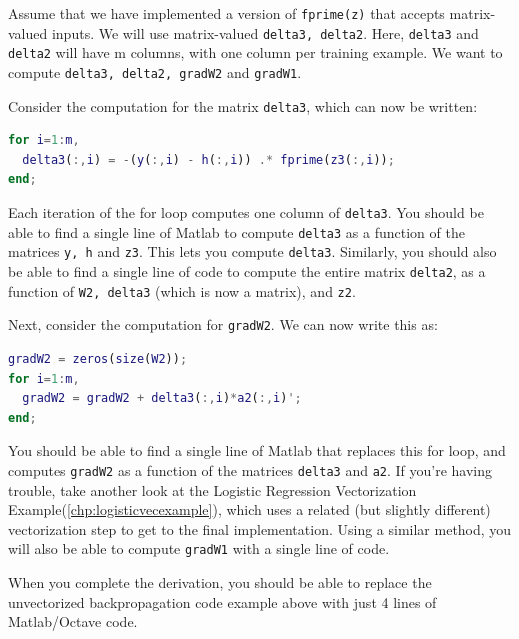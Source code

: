 Assume that we have implemented a version of \texttt{fprime(z)} that accepts matrix-valued inputs. We will use matrix-valued \texttt{delta3, delta2}. Here, \texttt{delta3} and \texttt{delta2} will have m columns, with one column per training example. We want to compute \texttt{delta3, delta2, gradW2} and \texttt{gradW1}.

Consider the computation for the matrix \texttt{delta3}, which can now be written:
\begin{lstlisting}[language=matlab]
for i=1:m, 
  delta3(:,i) = -(y(:,i) - h(:,i)) .* fprime(z3(:,i)); 
end;
\end{lstlisting}

Each iteration of the for loop computes one column of \texttt{delta3}. You should be able to find a single line of Matlab to compute \texttt{delta3} as a function of the matrices \texttt{y, h} and \texttt{z3}. This lets you compute \texttt{delta3}. Similarly, you should also be able to find a single line of code to compute the entire matrix \texttt{delta2}, as a function of \texttt{W2, delta3} (which is now a matrix), and \texttt{z2}.

Next, consider the computation for \texttt{gradW2}. We can now write this as:
\begin{lstlisting}[language=matlab]
gradW2 = zeros(size(W2));
for i=1:m, 
  gradW2 = gradW2 + delta3(:,i)*a2(:,i)';
end;
\end{lstlisting}

You should be able to find a single line of Matlab that replaces this for loop, and computes \texttt{gradW2} as a function of the matrices \texttt{delta3} and \texttt{a2}. If you're having trouble, take another look at the Logistic Regression Vectorization Example(\ref{chp:logisticvecexample}), which uses a related (but slightly different) vectorization step to get to the final implementation. Using a similar method, you will also be able to compute \texttt{gradW1} with a single line of code.

When you complete the derivation, you should be able to replace the unvectorized backpropagation code example above with just 4 lines of Matlab/Octave code. 
